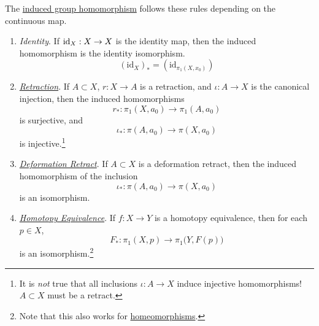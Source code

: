 	\begin{lemma}
	  \label{thm:induced-group-homomorphism-of-common-maps}
		The \hyperref[def:induced-group-homomorphism]{induced group homomorphism} follows these rules depending on the continuous map. 
		\begin{enumerate}
		  \item \textit{Identity}. If $\operatorname{id}_X: X \to X$ is the identity map, then the induced homomorphism is the identity isomorphism.  
				\begin{equation}
					(\mathrm{id}_X)_\ast = (\mathrm{id}_{\pi_1 (X, x_0)}) 
				\end{equation}

			\item \textit{\hyperref[def:retraction]{Retraction}}. If $A \subset X$, $r: X \to A$ is a retraction, and $\iota: A \to X$ is the canonical injection, then the induced homomorphisms
				\begin{equation}
				  r_\ast: \pi_1 (X, a_0) \to \pi_1 (A, a_0)
				\end{equation}
				is surjective, and 
				\begin{equation}
				  \iota_\ast: \pi(A, a_0) \to \pi(X, a_0)
				\end{equation}
				is injective.\footnote{It is \textit{not} true that all inclusions $\iota: A \to X$ induce injective homomorphisms! $A \subset X$ must be a retract.}

			\item \textit{\hyperref[def:deformation-retract]{Deformation Retract}}. If $A \subset X$ is a deformation retract, then the induced homomorphism of the inclusion 
				\begin{equation}
				  \iota_\ast: \pi(A, a_0) \to \pi(X, a_0)
				\end{equation}
				is an isomorphism. 

			\item \textit{\hyperref[def:homotopy-equivalence]{Homotopy Equivalence}}. If $f: X \to Y$ is a homotopy equivalence, then for each $p \in X$, 
				\begin{equation}
					F_\ast : \pi_1 (X, p) \to \pi_1 \big(Y, F(p) \big)
				\end{equation}
				is an isomorphism.\footnote{Note that this also works for \hyperref[pst-def:homeomorphism]{homeomorphisms}.} 

		\end{enumerate}
	\end{lemma}

